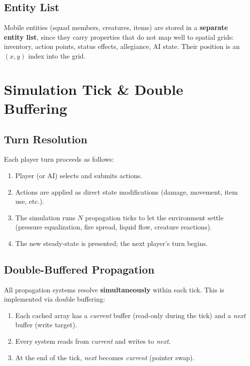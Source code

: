 \documentclass[11pt,a4paper]{article}
\begin{document}
\subsection{Entity List}

Mobile entities (squad members, creatures, items) are stored in a
\textbf{separate entity list}, since they carry properties that do not
map well to spatial grids: inventory, action points, status effects,
allegiance, AI state.  Their position is an $(x, y)$ index into the
grid.

\section{Simulation Tick \& Double Buffering}
\label{sec:tick}

\subsection{Turn Resolution}

Each player turn proceeds as follows:

\begin{enumerate}
    \item Player (or AI) selects and submits actions.
    \item Actions are applied as direct state modifications (damage,
          movement, item use, etc.).
    \item The simulation runs $N$ propagation ticks to let the
          environment settle (pressure equalization, fire spread, liquid
          flow, creature reactions).
    \item The new steady-state is presented; the next player's turn
          begins.
\end{enumerate}

\subsection{Double-Buffered Propagation}

All propagation systems resolve \textbf{simultaneously} within each
tick.  This is implemented via double buffering:

\begin{enumerate}
    \item Each cached array has a \emph{current} buffer (read-only
          during the tick) and a \emph{next} buffer (write target).
    \item Every system reads from \emph{current} and writes to
          \emph{next}.
    \item At the end of the tick, \emph{next} becomes \emph{current}
          (pointer swap).
\end{enumerate}
\end{document}
